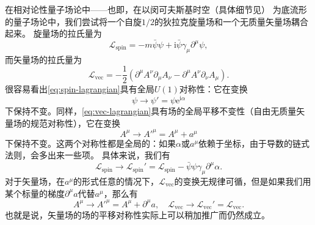 \documentclass[UTF8, a4paper]{ctexart}
\newcommand*{\ee}{\mathrm{e}}
\newcommand*{\ii}{\mathrm{i}}
\begin{document}
在相对论性量子场论中——也即，在以闵可夫斯基时空（具体细节见）
为底流形的量子场论中，我们尝试将一个自旋$1/2$的狄拉克旋量场和一个无质量矢量场耦合起来。
旋量场的拉氏量为
\begin{equation}
    \mathcal{L}_\text{spin} = - m \bar{\psi} \psi + \ii \bar{\psi} \gamma_\mu \partial^\mu \psi,
    \label{eq:spin-lagrangian}
\end{equation}
而矢量场的拉氏量为
\begin{equation}
    \mathcal{L}_\text{vec} = - \frac{1}{2} (\partial^\mu A^\nu \partial_\mu A_\nu - \partial^\mu A^\nu \partial_\nu A_\mu).
    \label{eq:vec-lagrangian}
\end{equation}
很容易看出\eqref{eq:spin-lagrangian}具有全局$U(1)$对称性：它在变换
\[
    \psi \longrightarrow \psi' = \psi \ee^{\ii \alpha}
\]
下保持不变。同样，\eqref{eq:vec-lagrangian}具有场的全局平移不变性（自由无质量矢量场的规范对称性），它在变换
\[
    A^\mu \longrightarrow A'^\mu = A^\mu + a^\mu
\]
下保持不变。这两个对称性都是全局的：如果$\alpha$或$a^\mu$依赖于坐标，由于导数的链式法则，会多出来一些项。
具体来说，我们有
\[
    \mathcal{L}_\text{spin} \longrightarrow \mathcal{L}_\text{spin}' = \mathcal{L}_\text{spin} - \bar{\psi} \psi \gamma_\mu \partial^\mu \alpha.
\]
对于矢量场，在$a^\mu$的形式任意的情况下，$\mathcal{L}_\text{vec}$的变换无规律可循，但是如果我们用某个标量的梯度$\partial^\mu a$代替$a^\mu$，那么有
\[
    A^\mu \longrightarrow A'^\mu = A^\mu + \partial^\mu a, \quad
    \mathcal{L}_\text{vec} \longrightarrow \mathcal{L}_\text{vec}' = \mathcal{L}_\text{vec}.
\]
也就是说，矢量场的场的平移对称性实际上可以稍加推广而仍然成立。
\end{document}
